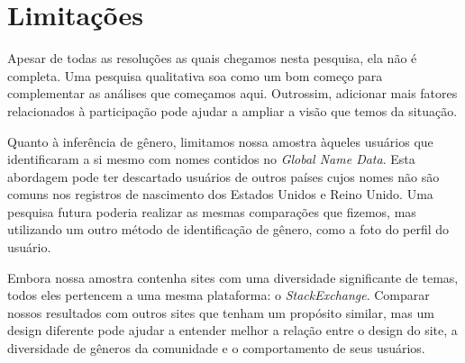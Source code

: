 
\chapter{Limitações}
\label{ch:limites}

Apesar de todas as resoluções as quais chegamos nesta pesquisa, ela não é completa. Uma pesquisa qualitativa soa como um bom começo para complementar as análises que começamos aqui. Outrossim, adicionar mais fatores relacionados à participação pode ajudar a ampliar a visão que temos da situação.


Quanto à inferência de gênero, limitamos nossa amostra àqueles usuários que identificaram a si mesmo com nomes contidos no \emph{Global Name Data}. Esta abordagem pode ter descartado usuários de outros países cujos nomes não são comuns nos registros de nascimento dos Estados Unidos e Reino Unido. Uma pesquisa futura poderia realizar as mesmas comparações que fizemos, mas utilizando um outro método de identificação de gênero, como a foto do perfil do usuário.


Embora nossa amostra contenha sites com uma diversidade significante de temas, todos eles pertencem a uma mesma plataforma: o \emph{StackExchange}. Comparar nossos resultados com outros sites que tenham um propósito similar, mas um design diferente pode ajudar a entender melhor a relação entre o design do site, a diversidade de gêneros da comunidade e o comportamento de seus usuários.

